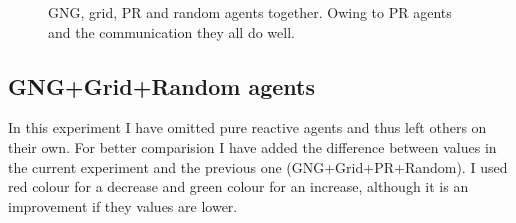 
\begin{figure}[h!]
  \centering        
  \caption{GNG, grid, PR and random agents together. Owing to PR agents and the communication they all do well.}
\end{figure}
       
\clearpage
                                
\subsection{GNG+Grid+Random agents}

In this experiment I have omitted pure reactive agents and thus left others on their own. For better comparision I have added the difference between values in the current experiment and the previous one (GNG+Grid+PR+Random). I used red colour for a decrease and green colour for an increase, although it is an improvement if they values are lower.         
             
